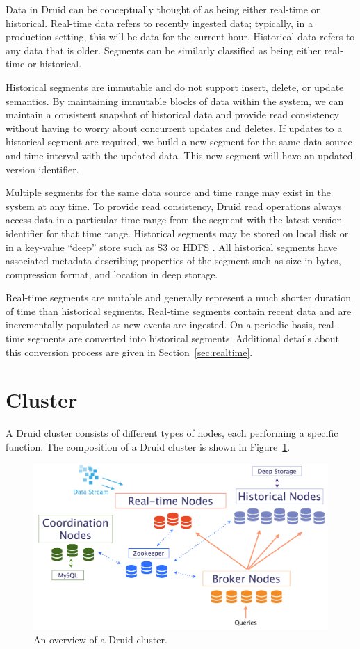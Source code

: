 \documentclass{vldb}
\begin{document}
Data in Druid can be conceptually thought of as being either real-time or historical. Real-time data refers to recently ingested data;
typically, in a production setting, this will be data for the current hour. Historical data refers to any data that is older. Segments can be similarly classified as being either real-time or historical.

Historical segments are immutable and do not support insert, delete, or update semantics. By maintaining immutable blocks of data within the system, we can maintain a consistent snapshot of historical data and provide read consistency without having to worry about
concurrent updates and deletes. If updates to a historical segment are required, we build a new segment for the same data source and time interval with the updated data. This new segment will have an updated version identifier.

Multiple segments for the same data source and time range may exist in the system at any time. To provide read consistency, Druid read operations always access data in a particular time range from the segment with the latest version identifier for that time range. Historical segments may be stored on local disk or in a key-value “deep” store such as S3 \cite{decandia2007dynamo} or HDFS \cite{shvachko2010hadoop}. All historical segments have associated metadata describing properties of the segment such as size in bytes, compression format, and location in deep storage.

Real-time segments are mutable and generally represent a much shorter duration of time than historical segments. Real-time segments contain recent data and are incrementally populated as new events are ingested. On a periodic basis, real-time segments are converted into historical segments. Additional details about this conversion process are given in Section~\ref{sec:realtime}.

\section{Cluster}
\label{sec:cluster}
A Druid cluster consists of different types of nodes, each performing a specific function. The composition of a Druid cluster is shown in Figure~\ref{fig:druid_cluster}.

\begin{figure}
\centering
\includegraphics[width = 6in]{druid_cluster}
\caption{An overview of a Druid cluster.}
\label{fig:druid_cluster}
\end{figure}
\end{document}
